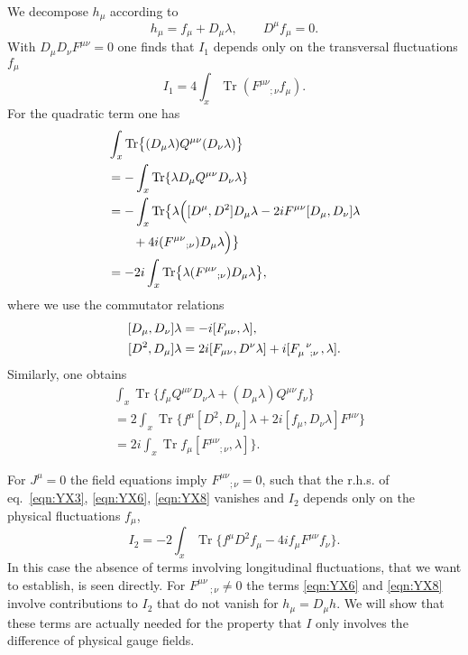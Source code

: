 \documentclass[twocolumn,aps,prd,amsmath,amssymb,preprintnumbers,longbibliography]{revtex4-1}
\numberwithin{equation}{section}
\DeclareMathOperator{\Tr}{Tr}
\newenvironment{alignedeqn}{\begin{equation}\begin{aligned}}{\end{aligned}\end{equation}\ignorespacesafterend}
\begin{document}
We decompose $h_\mu$ according to
\begin{equation}\label{eqn:YX5}
	h_\mu
	= f_\mu + D_\mu \lambda,
	\qquad
	D^\mu f_\mu
	= 0.
\end{equation}
With $D_\mu D_\nu F^{\mu\nu} = 0$ one finds that $I_1$ depends only on the transversal fluctuations $f_\mu$
\begin{equation}\label{eqn:YX5A}
	I_1
	= 4 \int_x \Tr(F^{\mu\nu}{_{;\nu}}f_\mu).
\end{equation}
For the quadratic term one has
\begin{alignedeqn}\label{eqn:YX6}
	&\int_x \Tr\bigl\{(D_\mu\lambda)Q^{\mu\nu}(D_\nu\lambda)\bigr\}\\
	&= -\int_x \Tr\{\lambda D_\mu Q^{\mu\nu} D_\nu\lambda\}\\
	&= -\int_x \Tr\bigl\{\lambda\Bigl([D^\mu,D^2]D_\mu\lambda - 2iF^{\mu\nu}[D_\mu, D_\nu]\lambda\\
	&\qquad + 4i (F^{\mu\nu}{_{;\nu}})D_\mu\lambda\Bigr)\bigr\}\\
	&= - 2 i \int_x \Tr\bigl\{\lambda(F^{\mu\nu}{_{;\nu}})D_\mu\lambda\bigr\},
\end{alignedeqn}
where we use the commutator relations
\begin{alignedeqn}\label{eqn:YX7}
	[D_\mu,D_\nu]\lambda
	&= -i[F_{\mu\nu},\lambda],\\
	[D^2,D_\mu]\lambda
	&= 2i [F_{\mu\nu},D^\nu\lambda] + i [\tensor{F}{_\mu^\nu_;_\nu},\lambda].
\end{alignedeqn}
Similarly, one obtains
\begin{alignedeqn}\label{eqn:YX8}
	&\int_x \Tr\bigl\{f_\mu Q^{\mu\nu} D_\nu\lambda + (D_\mu\lambda)Q^{\mu\nu}f_\nu\bigr\}\\
	&= 2 \int_x \Tr\bigl\{f^\mu[D^2,D_\mu]\lambda + 2i[f_\mu,D_\nu\lambda] F^{\mu\nu}\bigr\}\\
	&= 2i\int_x \Tr f_\mu[F^{\mu\nu}{_{;\nu}},\lambda]\bigr\}.
\end{alignedeqn}


For $J^\mu = 0$ the field equations imply $F^{\mu\nu}{_{;\nu}} = 0$, such that the r.h.s. of eq.~\eqref{eqn:YX3}, \eqref{eqn:YX6}, \eqref{eqn:YX8} vanishes and $I_2$ depends only on the physical fluctuations $f_\mu$,
\begin{equation}\label{eqn:YX9}
	I_2
	= -2 \int_x \Tr\{f^\mu D^2 f_\mu - 4 i f_\mu F^{\mu\nu} f_\nu\}.
\end{equation}
In this case the absence of terms involving longitudinal fluctuations, that we want to establish, is seen directly. For $F^{\mu\nu}\,_{;\nu}\neq 0$ the terms \eqref{eqn:YX6} and \eqref{eqn:YX8} involve contributions to $I_{2}$ that do not vanish for $h_{\mu}=D_{\mu}h$. We will show that these terms are actually needed for the property that $I$ only involves the difference of physical gauge fields.
\end{document}
